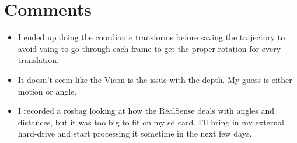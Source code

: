 \documentclass[12pt,a4paper]{article}
\begin{document}
\section{Comments}
\begin{itemize}
  \item I ended up doing the coordiante transforms before saving the trajectory to avoid vaing to go through each frame to get the proper rotation for every translation.
  \item It doesn't seem like the Vicon is the issue with the depth. My guess is either motion or angle.
  \item I recorded a rosbag looking at how the RealSense deals with angles and distances, but it was too big to fit on my sd card. I'll bring in my external hard-drive and start processing it sometime in the next few days.
\end{itemize}
\end{document}
